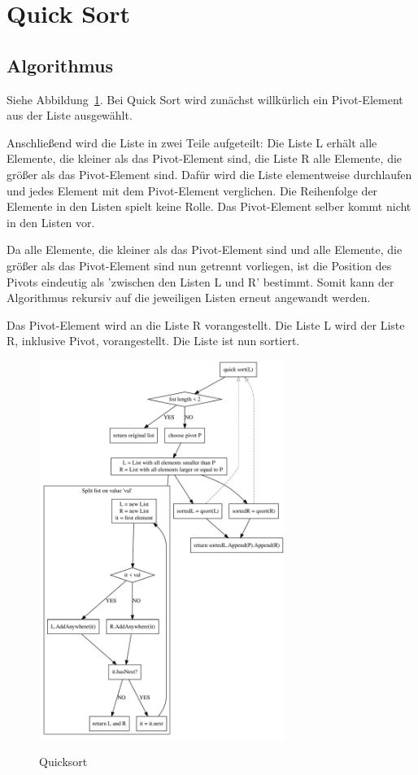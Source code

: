 \documentclass[11pt]{article}
\begin{document}
    \section{Quick Sort}\label{sec:quick-sort}

    \subsection{Algorithmus}\label{subsec:Qalgorithmus}
    Siehe Abbildung~\ref{fig:qsort}.
    Bei Quick Sort wird zunächst willkürlich ein Pivot-Element aus der Liste
    ausgewählt.

    Anschließend wird die Liste in zwei Teile aufgeteilt: Die Liste L erhält
    alle
    Elemente, die kleiner als das Pivot-Element sind, die Liste R alle
    Elemente, die größer als das Pivot-Element sind.
    Dafür wird die Liste elementweise durchlaufen und jedes Element mit dem
    Pivot-Element verglichen.
    Die Reihenfolge der Elemente in den Listen spielt keine Rolle.
    Das Pivot-Element selber kommt nicht in den Listen vor.

    Da alle Elemente, die kleiner als das Pivot-Element sind und alle Elemente,
    die größer als das Pivot-Element sind nun getrennt vorliegen, ist die
    Position des Pivots eindeutig als 'zwischen den Listen L und R' bestimmt.
    Somit kann der Algorithmus rekursiv auf die jeweiligen Listen erneut
    angewandt werden.

    Das Pivot-Element wird an die Liste R vorangestellt.
    Die Liste L wird der Liste R, inklusive Pivot, vorangestellt.
    Die Liste ist nun sortiert.

    \begin{figure}[hbt]
        \caption{Quicksort}
        \centering
        \includegraphics[width = 8cm]{qsort.pdf}\label{fig:qsort}
    \end{figure}
\end{document}
